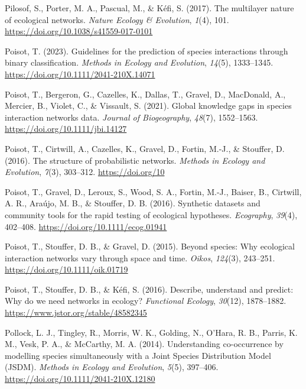 \documentclass[
]{article}
\newlength{\cslhangindent}
\newenvironment{CSLReferences}[2] %
 {\begin{list}{}{%
  \setlength{\itemindent}{0pt}
  \setlength{\leftmargin}{0pt}
  \setlength{\parsep}{0pt}
  \ifodd #1
   \setlength{\leftmargin}{\cslhangindent}
   \setlength{\itemindent}{-1\cslhangindent}
  \fi
  \setlength{\itemsep}{#2\baselineskip}}}
 {\end{list}}
\begin{document}
\begin{CSLReferences}{1}{0}
Pilosof, S., Porter, M. A., Pascual, M., \& Kéfi, S. (2017). The
multilayer nature of ecological networks. \emph{Nature Ecology \&
Evolution}, \emph{1}(4), 101.
\url{https://doi.org/10.1038/s41559-017-0101}

Poisot, T. (2023). Guidelines for the prediction of species interactions
through binary classification. \emph{Methods in Ecology and Evolution},
\emph{14}(5), 1333--1345. \url{https://doi.org/10.1111/2041-210X.14071}

Poisot, T., Bergeron, G., Cazelles, K., Dallas, T., Gravel, D.,
MacDonald, A., Mercier, B., Violet, C., \& Vissault, S. (2021). Global
knowledge gaps in species interaction networks data. \emph{Journal of
Biogeography}, \emph{48}(7), 1552--1563.
\url{https://doi.org/10.1111/jbi.14127}

Poisot, T., Cirtwill, A., Cazelles, K., Gravel, D., Fortin, M.-J., \&
Stouffer, D. (2016). The structure of probabilistic networks.
\emph{Methods in Ecology and Evolution}, \emph{7}(3), 303--312.
\url{https://doi.org/10}

Poisot, T., Gravel, D., Leroux, S., Wood, S. A., Fortin, M.-J., Baiser,
B., Cirtwill, A. R., Araújo, M. B., \& Stouffer, D. B. (2016). Synthetic
datasets and community tools for the rapid testing of ecological
hypotheses. \emph{Ecography}, \emph{39}(4), 402--408.
\url{https://doi.org/10.1111/ecog.01941}

Poisot, T., Stouffer, D. B., \& Gravel, D. (2015). Beyond species: Why
ecological interaction networks vary through space and time.
\emph{Oikos}, \emph{124}(3), 243--251.
\url{https://doi.org/10.1111/oik.01719}

Poisot, T., Stouffer, D. B., \& Kéfi, S. (2016). Describe, understand
and predict: Why do we need networks in ecology? \emph{Functional
Ecology}, \emph{30}(12), 1878--1882.
\url{https://www.jstor.org/stable/48582345}

Pollock, L. J., Tingley, R., Morris, W. K., Golding, N., O'Hara, R. B.,
Parris, K. M., Vesk, P. A., \& McCarthy, M. A. (2014). Understanding
co-occurrence by modelling species simultaneously with a {Joint Species
Distribution Model} ({JSDM}). \emph{Methods in Ecology and Evolution},
\emph{5}(5), 397--406. \url{https://doi.org/10.1111/2041-210X.12180}


\end{CSLReferences}
\end{document}
